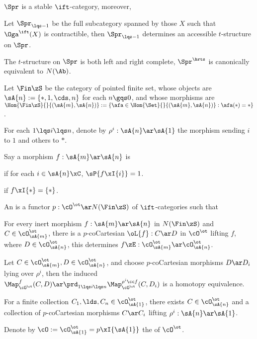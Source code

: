 \documentclass[article, a4paper, twoside]{universal}
\begin{document}
\begin{thm}[1.4.3.6]
    $\Spr$ is a stable $\ift$-category, moreover,
    \begin{enr}[label=(\arabic*)]
        \item Let $\Spr_{\lqs-1}$ be the full subcategory spanned by those $X$ such that $\Oga^{\ift}(X)$ is contractible, then $\Spr_{\lqs-1}$ determines an accessible $t$-structure on $\Spr$.
        \item The $t$-structure on $\Spr$ is both left and right complete, $\Spr^{\hrts}$ is canonically equivalent to $N(\Ab)$.
    \end{enr}
\end{thm}


\begin{dfn}[2.0.0.2]
    Let $\Fin\zS$ be the category of pointed finite set, whose objects are $\sA{n}:=\{*,1,\cds,n\}$ for each $n\gqs0$, and whose morphisms are $\Hom{\Fin\zS}{}{(\sA{m},\sA{n})}:=\{\afa\in\Hom{\Set}{}{(\sA{m},\sA{n})}:\afa(*)=*\}$.

    For each $1\lqs i\lqs n$, denote by $\rho^{i}:\sA{n}\ar\sA{1}$ the morphism sending $i$ to $1$ and others to $*$.
\end{dfn}

\begin{dfn}[2.1.1.8, 2.1.2.1]
    Say a morphism $f:\sA{m}\ar\sA{n}$ is
    \begin{enr}[label=(\arabic*)]
        \item {} if for each $i\in\sA{n}\xC$, $\sP{f\xI\{i\}}=1$.
        \item {} if $f\xI\{*\}=\{*\}$.
    \end{enr}
\end{dfn}

\begin{dfn}[2.1.1.10, 2.1.1.12]
    An  is a functor $p:\cO^{\ot}\ar N(\Fin\zS)$ of $\ift$-categories such that
    \begin{enr}[label=(\arabic*)]
        \item For every inert morphism $f:\sA{m}\ar\sA{n}$ in $N(\Fin\zS)$ and $C\in\cO^{\ot}_{\sA{m}}$, there is a $p$-coCartesian $\oL{f}:C\ar D$ in $\cO^{\ot}$ lifting $f$, where $D\in\cO^{\ot}_{\sA{n}}$, this determines $f\zE:\cO_{\sA{m}}^{\ot}\ar\cO_{\sA{n}}^{\ot}$.
        \item Let $C\in\cO_{\sA{m}}^{\ot},D\in\cO_{\sA{n}}^{\ot}$, and choose $p$-coCartesian morphisms $D\ar D_{i}$ lying over $\rho^{i}$, then the induced $\Map_{\cO^{\ot}}^{f}(C,D)\ar\prd_{1\lqs i\lqs n}\Map_{\cO^{\ot}}^{\rho^{i}\cc f}(C,D_{i})$ is a homotopy equivalence.
        \item For a finite collection $C_{1},\lds,C_{n}\in\cO_{\sA{1}}^{\ot}$, there exists $C\in\cO_{\sA{n}}^{\ot}$ and a collection of $p$-coCartesian morphisms $C\ar C_{i}$ lifting $\rho^{i}:\sA{n}\ar\sA{1}$.
    \end{enr}

    Denote by $\cO:=\cO^{\ot}_{\sA{1}}=p\xI\{\sA{1}\}$ the  of $\cO^{\ot}$.
\end{dfn}
\end{document}
